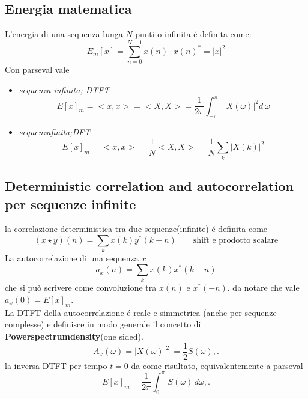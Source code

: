 \documentclass[11pt,a4paper,DIV12,BCOR1.5mm]{scrartcl}
\begin{document}
\subsection{Energia matematica}
L'energia di una sequenza lunga $N$ punti o infinita é definita come:
\begin{equation}
E_m[x] = \sum_{n=0}^{N-1} x(n)\cdot x(n)^* = |x|^2
\end{equation}
Con parseval vale
\begin{itemize}
	\item \textit{sequenza infinita; DTFT}
	\begin{equation}
	E[x]_m =  <x,x> = <X,X> =   \frac{1}{2\pi} \int_{-\pi}^{\pi} |X(\omega)|^2d\,\omega
	\end{equation}
	\item \textit{sequenzafinita;DFT}
	\begin{equation}
	E[x]_m =  <x,x> = \frac{1}{N} <X,X> =   \frac{1}{N} \sum_k |X(k)|^2
	\end{equation}
\end{itemize}

\subsection{Deterministic correlation and autocorrelation per sequenze infinite}
la correlazione deterministica tra due sequenze(infinite) é definita come
\begin{equation}
 (x\star y)(n)=  \sum_k x(k) y^*(k-n) \qquad \textrm{shift e prodotto scalare}
\end{equation}
La autocorrelazione di una sequenza $x$
\begin{equation}
a_x(n)=  \sum_k x(k) x^*(k-n) 
\end{equation}
che si può scrivere come convoluzione tra $x(n)$ e $x^*(-n)$. da notare che vale $a_x(0) = E[x]_m $. \\
La DTFT della autocorrelazione é reale e simmetrica (anche per sequenze complesse) e definisce in modo generale il concetto di \textbf{Powerspectrumdensity}(one sided).
\begin{equation}
A_x(\omega) = |X(\omega)|^2\ =\frac{1}{2} S(\omega),.
\end{equation}
la inversa DTFT per tempo $t=0$  da come risultato, equivalentemente a parseval
\begin{equation}
E[x]_m =  \frac{1}{2\pi}\int_0^\pi\,S(\omega)\,d\omega,.
\end{equation}
\end{document}
